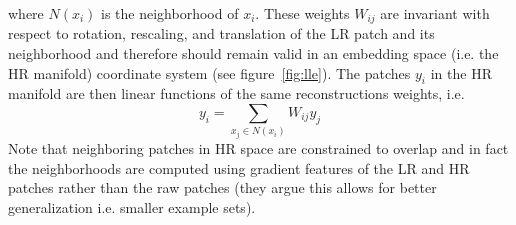 where $N(x_i)$ is the neighborhood of $x_i$.
%
These weights $W_{ij}$ are invariant with respect to rotation, rescaling, and translation of the LR patch and its neighborhood\cite{saul2000introduction} and therefore should remain valid in an embedding space (i.e. the HR manifold) coordinate system (see figure~\ref{fig:lle}).
%
The patches $y_i$ in the HR manifold are then linear functions of the same reconstructions weights, i.e.
\begin{equation}
    y_i = \sum_{x_j \in N(x_i)} W_{ij} y_j
\end{equation}
%
Note that neighboring patches in HR space are constrained to overlap and in fact the neighborhoods are computed using gradient features of the LR and HR patches rather than the raw patches (they argue this allows for better generalization i.e. smaller example sets).

